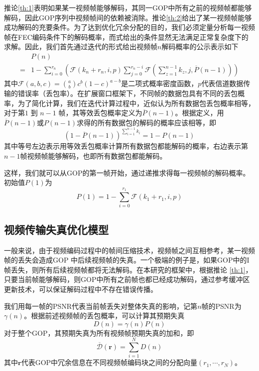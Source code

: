     推论\ref{th:1}表明如果某一视频帧能够解码，其同一GOP中所有之前的视频帧都能够解码，因此GOP序列中视频帧间的依赖被消除。推论\ref{th:2}给出了某一视频帧能够成功解码的充要条件。为了达到优化冗余分配的目的，我们必须定量分析每一视频帧在FEC编码条件下的解码概率，而式\label{eq:consn}给出的条件显然无法满足正常复杂度下的求解。因此，我们首先通过迭代的形式给出视频帧$n$解码概率的公示表示如下
    \begin{equation}\label{eq:ep_nth}
        \begin{split}
        &P(n) \\
        = &1 - \sum_{i=0}^{ r_{n} } (\mathcal{F}(k_{n}+r_{n}, i, p) \sum_{j=0}^{ r_{n} - i } \mathcal{F}(\sum_{z=1}^{n-1}k_z, j, \overline{P}(n-1)))
        \end{split}
    \end{equation}
    其中$\mathcal{F}(a, b, c)={a \choose b} c^{b} (1-c)^{a-b}$是二项式概率密度函数，$p$代表信道数据传输的错误率（丢包率）。在扩展窗口框架下，不同帧的数据包具有不同的丢包概率，为了简化计算，我们在迭代计算过程中，近似认为所有数据包丢包概率相等，对于第$1$ 到 $n-1$ 帧，其等效丢包概率定义为$\overline{P}(n-1)$。根据定义，用$\overline{P}(n-1)$或$P(n-1)$求得的所有数据包的解码的概率应该相等，即
    \begin{equation}\label{eq:eq}
    (1 - \overline{P}(n-1))^{\sum_{i=1}^{n-1}k_i} = 1 - P(n-1)
    \end{equation}
    其中等号左边表示用等效丢包概率计算所有数据包都能解码的概率，右边表示第$n-1$帧视频帧能够解码，也即所有数据包都能解码。

    这样，我们就可以从GOP的第一帧开始，通过递推求得每一视频帧的解码概率。初始值$P(1)$为
    \begin{equation}\label{eq:first_packet}
    P(1) = 1 - \sum_{i=0}^{r_1} \mathcal{F}(k_1+r_1, i, p)
    \end{equation}


    \subsection{视频传输失真优化模型}
    一般来说，由于视频编码过程中的帧间压缩技术，视频帧之间互相参考，某一视频帧的丢失会造成GOP 中后续视频帧的失真。一个极端的例子是，如果GOP中的I帧丢失，则所有后续视频帧都将无法解码。在本研究的框架中，根据推论 \ref{th:1}，只要当前帧能够解码，则GOP中所有之前帧也都已经成功解码，通过参考缓冲区更新技术，可以保证解码过程中不存在错误传播。

    我们用每一帧的PSNR代表当前帧丢失对整体失真的影响，记第$n$帧的PSNR为$\gamma(n)$。根据前述视频帧的丢包概率，可以计算其预期失真
    \begin{equation}\label{eq:distortion}
      D(n)=\gamma(n)P(n)
    \end{equation}
    对于整个GOP，其预期失真为所有视频帧预期失真的加和，即
    \begin{equation}\label{t_dist}
    \overline{\mathcal{D}}(\mathbf{r}) = \sum_{i=1}^{N}D(n)
    \end{equation}
    其中$\mathbf{r}$代表GOP中冗余信息在不同视频帧编码块之间的分配向量$(r_1,\cdots,r_N)$。


